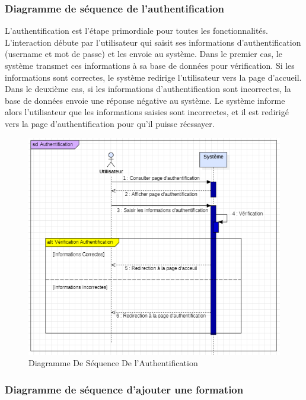 \subsubsection*{Diagramme de séquence de l’authentification}

L’authentification est l’étape primordiale pour toutes les fonctionnalités. L'interaction débute par l’utilisateur qui saisit ses informations d'authentification (username et mot de passe) et les envoie au système.
Dans le premier cas, le système transmet ces informations à sa base de données pour vérification. Si les informations sont correctes, le système redirige l'utilisateur vers la page d'accueil.
Dans le deuxième cas, si les informations d'authentification sont incorrectes, la base de données envoie une réponse négative au système. Le système informe alors l'utilisateur que les informations saisies sont incorrectes, et il est redirigé vers la page d'authentification pour qu'il puisse réessayer.


\begin{figure}[H]
    \centering
    \includegraphics[width=19cm]{Figures/diagrammeDeSequenceAuthentification.png}
    \caption{Diagramme De Séquence De l'Authentification}
\end{figure}

\subsubsection*{Diagramme de séquence d’ajouter une formation}

